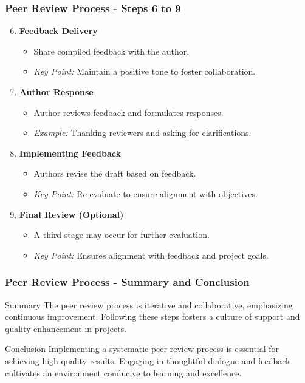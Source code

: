 \documentclass{beamer}
\begin{document}
\begin{frame}[fragile]
    \frametitle{Peer Review Process - Steps 6 to 9}
    \begin{enumerate}
        \setcounter{enumi}{5} %
        \item \textbf{Feedback Delivery}
            \begin{itemize}
                \item Share compiled feedback with the author.
                \item \textit{Key Point:} Maintain a positive tone to foster collaboration.
            \end{itemize}

        \item \textbf{Author Response}
            \begin{itemize}
                \item Author reviews feedback and formulates responses.
                \item \textit{Example:} Thanking reviewers and asking for clarifications.
            \end{itemize}

        \item \textbf{Implementing Feedback}
            \begin{itemize}
                \item Authors revise the draft based on feedback.
                \item \textit{Key Point:} Re-evaluate to ensure alignment with objectives.
            \end{itemize}

        \item \textbf{Final Review (Optional)}
            \begin{itemize}
                \item A third stage may occur for further evaluation.
                \item \textit{Key Point:} Ensures alignment with feedback and project goals.
            \end{itemize}
    \end{enumerate}
\end{frame}

\begin{frame}[fragile]
    \frametitle{Peer Review Process - Summary and Conclusion}
    \begin{block}{Summary}
        The peer review process is iterative and collaborative, emphasizing continuous improvement. Following these steps fosters a culture of support and quality enhancement in projects.
    \end{block}
    
    \begin{block}{Conclusion}
        Implementing a systematic peer review process is essential for achieving high-quality results. Engaging in thoughtful dialogue and feedback cultivates an environment conducive to learning and excellence.
    \end{block}
\end{frame}
\end{document}
